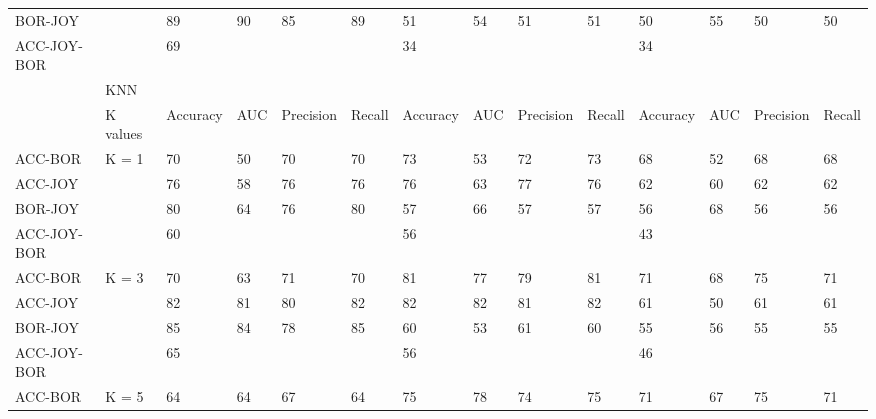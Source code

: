 \begin{sidewaystable}[]
{\begin{tabular}{llllllllllllll}
		BOR-JOY     &                             & 89       & 90  & 85        & 89     & 51            & 54       & 51             & 51          & 50       & 55  & 50        & 50     \\
		ACC-JOY-BOR &                             & 69       &     &           &        & 34            &          &                &             & 34       &     &           &        \\ \hline
		            & KNN                            \\ 
		& K values               & Accuracy & AUC & Precision & Recall & Accuracy       & AUC      & Precision      & Recall      & Accuracy & AUC & Precision & Recall \\ \hline
		ACC-BOR     & \multirow{4}{*}{K = 1} & 70       & 50  & 70        & 70     & 73             & 53       & 72             & 73          & 68       & 52  & 68        & 68     \\
		ACC-JOY     &                        & 76       & 58  & 76        & 76     & 76             & 63       & 77             & 76          & 62       & 60  & 62        & 62     \\
		BOR-JOY     &                        & 80       & 64  & 76        & 80     & 57             & 66       & 57             & 57          & 56       & 68  & 56        & 56     \\
		ACC-JOY-BOR &                        & 60       &     &           &        & 56             &          &                &             & 43       &     &           &        \\
		ACC-BOR     & \multirow{4}{*}{K = 3} & 70       & 63  & 71        & 70     & 81             & 77       & 79             & 81          & 71       & 68  & 75        & 71     \\
		ACC-JOY     &                        & 82       & 81  & 80        & 82     & 82             & 82       & 81             & 82          & 61       & 50  & 61        & 61     \\
		BOR-JOY     &                        & 85       & 84  & 78        & 85     & 60             & 53       & 61             & 60          & 55       & 56  & 55        & 55     \\
		ACC-JOY-BOR &                        & 65       &     &           &        & 56             &          &                &             & 46       &     &           &        \\
		ACC-BOR     & \multirow{4}{*}{K = 5} & 64       & 64  & 67        & 64     & 75             & 78       & 74             & 75          & 71       & 67  & 75        & 71     \\

\end{tabular}}
\end{sidewaystable}
